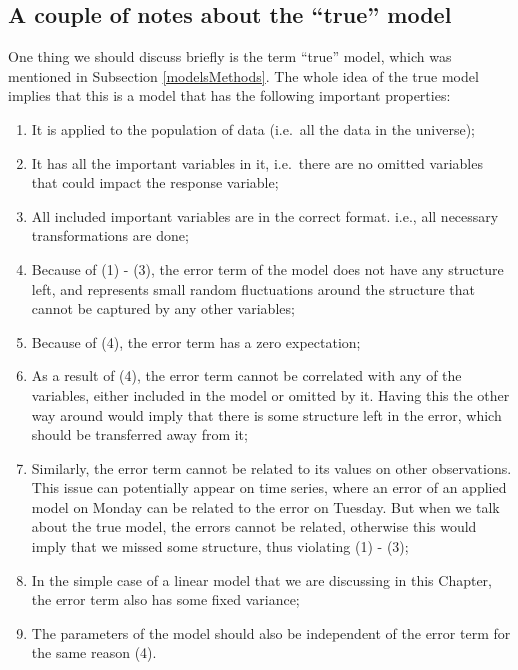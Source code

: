 \documentclass[
]{book}
\providecommand{\tightlist}{%
  \setlength{\itemsep}{0pt}\setlength{\parskip}{0pt}}
\theoremstyle{definition}
\theoremstyle{definition}
\theoremstyle{definition}
\theoremstyle{definition}
\theoremstyle{remark}
\begin{document}
\subsection{A couple of notes about the ``true'' model}\label{TrueModel}

One thing we should discuss briefly is the term ``true'' model, which was mentioned in Subsection \ref{modelsMethods}. The whole idea of the true model implies that this is a model that has the following important properties:

\begin{enumerate}
\def\labelenumi{\arabic{enumi}.}
\tightlist
\item
  It is applied to the population of data (i.e.~all the data in the universe);
\item
  It has all the important variables in it, i.e.~there are no omitted variables that could impact the response variable;
\item
  All included important variables are in the correct format. i.e., all necessary transformations are done;
\item
  Because of (1) - (3), the error term of the model does not have any structure left, and represents small random fluctuations around the structure that cannot be captured by any other variables;
\item
  Because of (4), the error term has a zero expectation;
\item
  As a result of (4), the error term cannot be correlated with any of the variables, either included in the model or omitted by it. Having this the other way around would imply that there is some structure left in the error, which should be transferred away from it;
\item
  Similarly, the error term cannot be related to its values on other observations. This issue can potentially appear on time series, where an error of an applied model on Monday can be related to the error on Tuesday. But when we talk about the true model, the errors cannot be related, otherwise this would imply that we missed some structure, thus violating (1) - (3);
\item
  In the simple case of a linear model that we are discussing in this Chapter, the error term also has some fixed variance;
\item
  The parameters of the model should also be independent of the error term for the same reason (4).
\end{enumerate}
\end{document}
